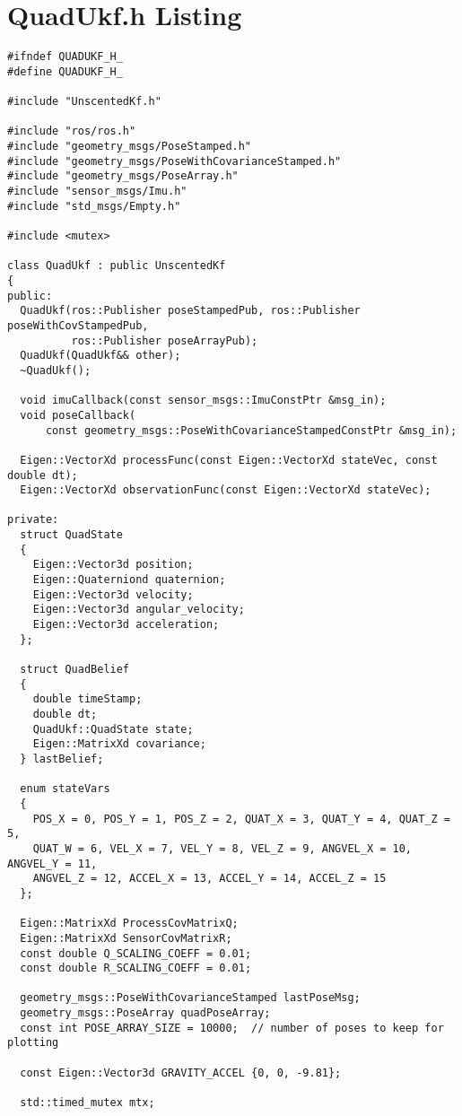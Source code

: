 \chapter{QuadUkf.h Listing}

\begin{verbatim}
#ifndef QUADUKF_H_
#define QUADUKF_H_

#include "UnscentedKf.h"

#include "ros/ros.h"
#include "geometry_msgs/PoseStamped.h"
#include "geometry_msgs/PoseWithCovarianceStamped.h"
#include "geometry_msgs/PoseArray.h"
#include "sensor_msgs/Imu.h"
#include "std_msgs/Empty.h"

#include <mutex>

class QuadUkf : public UnscentedKf
{
public:
  QuadUkf(ros::Publisher poseStampedPub, ros::Publisher poseWithCovStampedPub,
          ros::Publisher poseArrayPub);
  QuadUkf(QuadUkf&& other);
  ~QuadUkf();

  void imuCallback(const sensor_msgs::ImuConstPtr &msg_in);
  void poseCallback(
      const geometry_msgs::PoseWithCovarianceStampedConstPtr &msg_in);

  Eigen::VectorXd processFunc(const Eigen::VectorXd stateVec, const double dt);
  Eigen::VectorXd observationFunc(const Eigen::VectorXd stateVec);

private:
  struct QuadState
  {
    Eigen::Vector3d position;
    Eigen::Quaterniond quaternion;
    Eigen::Vector3d velocity;
    Eigen::Vector3d angular_velocity;
    Eigen::Vector3d acceleration;
  };

  struct QuadBelief
  {
    double timeStamp;
    double dt;
    QuadUkf::QuadState state;
    Eigen::MatrixXd covariance;
  } lastBelief;

  enum stateVars
  {
    POS_X = 0, POS_Y = 1, POS_Z = 2, QUAT_X = 3, QUAT_Y = 4, QUAT_Z = 5,
    QUAT_W = 6, VEL_X = 7, VEL_Y = 8, VEL_Z = 9, ANGVEL_X = 10, ANGVEL_Y = 11,
    ANGVEL_Z = 12, ACCEL_X = 13, ACCEL_Y = 14, ACCEL_Z = 15
  };

  Eigen::MatrixXd ProcessCovMatrixQ;
  Eigen::MatrixXd SensorCovMatrixR;
  const double Q_SCALING_COEFF = 0.01;
  const double R_SCALING_COEFF = 0.01;

  geometry_msgs::PoseWithCovarianceStamped lastPoseMsg;
  geometry_msgs::PoseArray quadPoseArray;
  const int POSE_ARRAY_SIZE = 10000;  // number of poses to keep for plotting

  const Eigen::Vector3d GRAVITY_ACCEL {0, 0, -9.81};

  std::timed_mutex mtx;


\end{verbatim}
